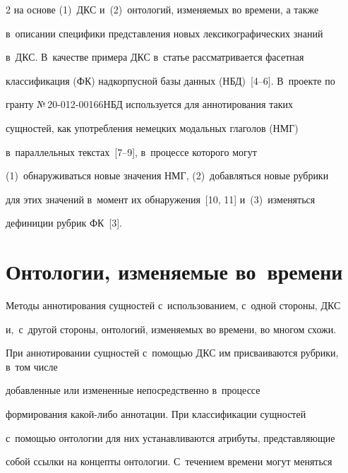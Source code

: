 \begin{multicols}{2}
на основе (1)~ДКС и~(2)~онтологий, изменяемых во времени, а также 


в~описании специфики представления новых лексикографических знаний 


в~ДКС. В~качестве примера ДКС в~статье рассматривается фасетная 


классификация (ФК) надкорпусной базы данных (НБД)~[4--6]. В~проекте по 


гранту №\,20-012-00166\linebreak НБД используется для аннотирования таких 


сущностей, как употребления немецких модальных глаго\-лов (НМГ) 


в~параллельных текстах~[7--9], в~процессе которого могут 


(1)~обнаруживаться новые значения НМГ, (2)~добавляться новые рубрики 


для этих значений в~момент их обнаружения~[10, 11] и~(3)~изменяться 


дефиниции рубрик ФК~[3].





\vspace*{-14pt}





\section{Онтологии, изменяемые во~времени}





\vspace*{-4pt}





Методы аннотирования сущностей с~использованием, с~одной стороны, ДКС 


и,~с~другой стороны, онтологий, изменяемых во времени, во многом схожи. 


При аннотировании сущностей \mbox{с~по\-мощью} ДКС им присваиваются рубрики, в~том числе 


до\-бав\-лен\-ные или измененные непосредственно в~процессе 


формирования ка\-кой-ли\-бо аннотации. При классификации сущностей 


с~по\-мощью онтологии для них устанавливаются атрибуты, пред\-став\-ля\-ющие 


собой ссылки на концепты онтологии. С~течением времени могут меняться 



\end{multicols}
